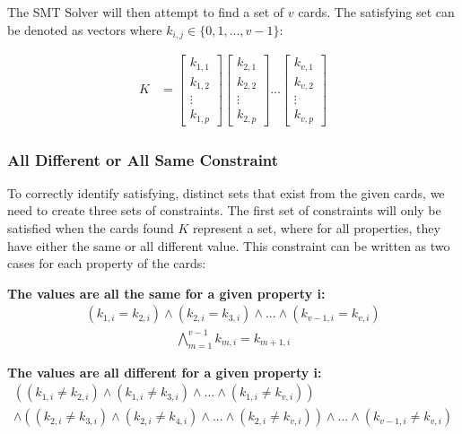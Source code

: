 \documentclass[pageno]{jpaper}
\begin{document}
The SMT Solver will then attempt to find a set of $v$ cards. The satisfying set can be denoted as vectors where $k_{i,j} \in \{0,1, ... , v-1\}$:

\begin{align}
    K &= \begin{bmatrix}
           k_{1,1} \\
           k_{1,2} \\
           \vdots \\
           k_{1,p}
         \end{bmatrix}
         \begin{bmatrix}
           k_{2,1} \\
           k_{2,2} \\
           \vdots \\
           k_{2,p}
         \end{bmatrix} ... 
          \begin{bmatrix}
           k_{v,1} \\
           k_{v,2} \\
           \vdots \\
           k_{v,p}
         \end{bmatrix}
  \end{align}

\subsubsection{All Different or All Same Constraint}
To correctly identify satisfying, distinct sets that exist from the given cards, we need to create three sets of constraints. The first set of constraints will only be satisfied when the cards found $K$ represent a set, where for all properties, they have either the same or all different value. This constraint can be written as two cases for each property of the cards:

\textbf{The values are all the same for a given property i:} 
\begin{align}
	(k_{1,i} = k_{2,i}) \wedge (k_{2,i} = k_{3,i}) \wedge ... \wedge (k_{v-1,i} = k_{v,i})
\end{align}
\begin{align}
	\bigwedge \limits_{m=1}^{v-1} k_{m,i} = k_{m+1,i}
\end{align}

\textbf{The values are all different for a given property i:}
\begin{multline}
	((k_{1,i} \neq k_{2,i}) \wedge (k_{1,i} \neq k_{3,i}) \wedge ... \wedge (k_{1,i} \neq k_{v,i})) \\
	 \wedge ((k_{2,i} \neq k_{3,i}) \wedge (k_{2,i} \neq k_{4,i}) \wedge ... \wedge (k_{2,i} \neq k_{v,i})) \wedge 
	 ... \wedge (k_{v-1,i} \neq k_{v,i})
\end{multline}
\end{document}
